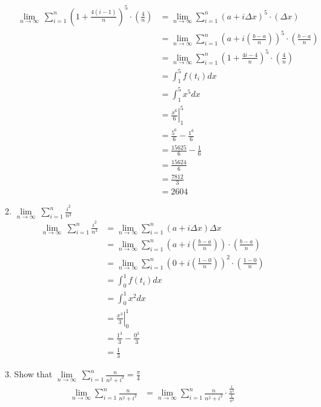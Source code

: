 \documentclass[12pt,letterpaper]{article}
\theoremstyle{case}
\theoremstyle{definition}
\begin{document}
\begin{enumerate}
\begin{enumerate}
			\begin{align*}
				\lim\limits_{n \to \infty}\ \sum\limits_{i=1}^{n} \left(1 + \frac{4(i-1)}{n}\right)^5\cdot \left(\frac{4}{n}\right) &= \lim\limits_{n \to \infty} \sum_{i=1}^{n} \left(a+i\Delta x\right)^5\cdot \left(\Delta x\right) \\
				&= \lim\limits_{n \to \infty} \sum_{i=1}^{n} \left(a+i\left(\frac{b-a}{n}\right)\right)^5 \cdot \left(\frac{b-a}{n}\right) \\
				&= \lim\limits_{n \to \infty} \sum_{i=1}^{n} \left(1+\frac{4i-4}{n}\right)^5\cdot\left(\frac{4}{n}\right)\\
				&=\int_{1}^{5} f(t_i)dx \\
				&= \int_{1}^{5} x^5 dx \\
				&= \left. \frac{x^6}{6} \right|_1^5 \\
				&= \frac{5^6}{6}-\frac{1^6}{6} \\
				&= \frac{15625}{6}-\frac{1}{6} \\
				&= \frac{15624}{6} \\
				&= \frac{7812}{3} \\
				&= 2604
			\end{align*}
			\item $\lim\limits_{n \to \infty}\ \sum\limits_{i=1}^{n} \frac{i^2}{n^3}$
			\begin{align*}
				\lim\limits_{n \to \infty}\ \sum\limits_{i=1}^{n} \frac{i^2}{n^3} &= \lim\limits_{n \to \infty} \sum_{i=1}^{n} (a+i\Delta x)\Delta x \\
				&= \lim\limits_{n \to \infty} \sum_{i=1}^{n} \left(a+i\left(\frac{b-a}{n}\right)\right)\cdot\left(\frac{b-a}{n}\right) \\
				&= \lim\limits_{n \to \infty} \sum_{i=1}^{n} \left(0+i\left(\frac{1-0}{n}\right)\right)^2 \cdot \left(\frac{1-0}{n}\right) \\
				&= \int_{0}^{1} f(t_i)dx \\
				&= \int_{0}^{1} x^2 dx \\
				&= \left.\frac{x^3}{3}\right|_0^1 \\
				&= \frac{1^3}{3} - \frac{0^3}{3} \\
				&= \frac{1}{3}
			\end{align*}
			\item Show that $\lim\limits_{n \to \infty}\ \sum\limits_{i=1}^{n} \frac{n}{n^2+i^2}=\frac{\pi}{4}$
			\begin{align*}
				\lim\limits_{n \to \infty} \sum_{i=1}^{n} \frac{n}{n^2+i^2} &= \lim\limits_{n \to \infty} \sum_{i=1}^{n} \frac{n}{n^2+i^2}\cdot \frac{\frac{1}{n^2}}{\frac{1}{n^2}} \\

\end{align*}
\end{enumerate}
\end{enumerate}
\end{document}
